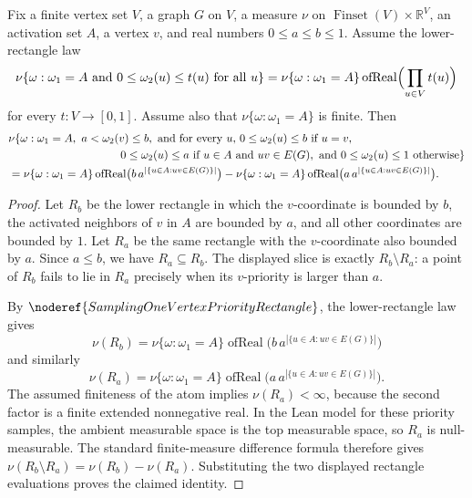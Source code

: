 \begin{helper}
Fix a finite vertex set \(V\), a graph \(G\) on \(V\), a measure \(\nu\) on
\(\operatorname{Finset}(V)\times \mathbb R^V\), an activation set \(A\), a
vertex \(v\), and real numbers \(0\le a\le b\le 1\).  Assume the lower-rectangle
law
\[
\nu\{\omega:\omega_1=A\text{ and }0\le \omega_2(u)\le t(u)\text{ for all }u\}
=
\nu\{\omega:\omega_1=A\}\operatorname{ofReal}\Bigl(\prod_{u\in V}t(u)\Bigr)
\]
for every \(t:V\to[0,1]\).  Assume also that
\(\nu\{\omega:\omega_1=A\}\) is finite.  Then
\[
\begin{aligned}
&\nu\{\omega:\omega_1=A,\ a<\omega_2(v)\le b,\text{ and for every }u,\,
0\le \omega_2(u)\le b\text{ if }u=v,\\
&\hspace{35mm}
0\le \omega_2(u)\le a\text{ if }u\in A\text{ and }uv\in E(G),\text{ and }
0\le \omega_2(u)\le1\text{ otherwise}\}\\
&=
\nu\{\omega:\omega_1=A\}\operatorname{ofReal}
\bigl(b\,a^{|\{u\in A:uv\in E(G)\}|}\bigr)
-
\nu\{\omega:\omega_1=A\}\operatorname{ofReal}
\bigl(a\,a^{|\{u\in A:uv\in E(G)\}|}\bigr).
\end{aligned}
\]
\end{helper}
\begin{proof}
Let \(R_b\) be the lower rectangle in which the \(v\)-coordinate is bounded by
\(b\), the activated neighbors of \(v\) in \(A\) are bounded by \(a\), and all
other coordinates are bounded by \(1\).  Let \(R_a\) be the same rectangle with
the \(v\)-coordinate also bounded by \(a\).  Since \(a\le b\), we have
\(R_a\subseteq R_b\).  The displayed slice is exactly \(R_b\setminus R_a\): a
point of \(R_b\) fails to lie in \(R_a\) precisely when its \(v\)-priority is
larger than \(a\).

By \(\noderef{SamplingOneVertexPriorityRectangle}\), the lower-rectangle law
gives
\[
\nu(R_b)=\nu\{\omega:\omega_1=A\}\operatorname{ofReal}
\bigl(b\,a^{|\{u\in A:uv\in E(G)\}|}\bigr)
\]
and similarly
\[
\nu(R_a)=\nu\{\omega:\omega_1=A\}\operatorname{ofReal}
\bigl(a\,a^{|\{u\in A:uv\in E(G)\}|}\bigr).
\]
The assumed finiteness of the atom implies \(\nu(R_a)<\infty\), because the
second factor is a finite extended nonnegative real.  In the Lean model for
these priority samples, the ambient measurable space is the top measurable
space, so \(R_a\) is null-measurable.  The standard finite-measure difference
formula therefore gives
\(\nu(R_b\setminus R_a)=\nu(R_b)-\nu(R_a)\).  Substituting the two displayed
rectangle evaluations proves the claimed identity.
\end{proof}
